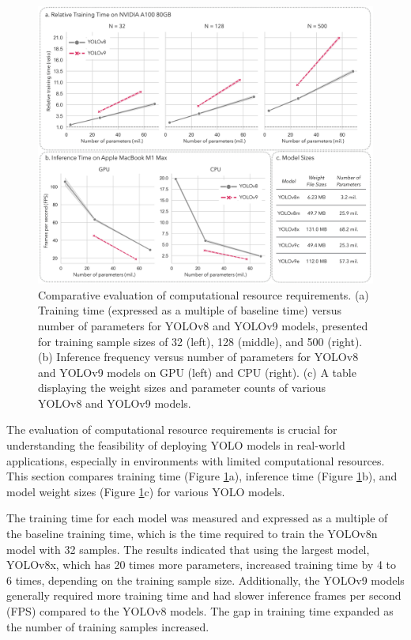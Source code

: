 \begin{figure}[h]
    \centering
    \includegraphics[width=1\textwidth]{figure_6.jpg}
    \caption{Comparative evaluation of computational resource requirements. (a) Training time (expressed as a multiple of baseline time) versus number of parameters for YOLOv8 and YOLOv9 models, presented for training sample sizes of 32 (left), 128 (middle), and 500 (right). (b) Inference frequency versus number of parameters for YOLOv8 and YOLOv9 models on GPU (left) and CPU (right). (c) A table displaying the weight sizes and parameter counts of various YOLOv8 and YOLOv9 models.}
    \label{fig:resources}
\end{figure}

The evaluation of computational resource requirements is crucial for understanding the feasibility of deploying YOLO models in real-world applications, especially in environments with limited computational resources. This section compares training time (Figure \ref{fig:resources}a), inference time (Figure \ref{fig:resources}b), and model weight sizes (Figure \ref{fig:resources}c) for various YOLO models.

The training time for each model was measured and expressed as a multiple of the baseline training time, which is the time required to train the YOLOv8n model with 32 samples. The results indicated that using the largest model, YOLOv8x, which has 20 times more parameters, increased training time by 4 to 6 times, depending on the training sample size. Additionally, the YOLOv9 models generally required more training time and had slower inference frames per second (FPS) compared to the YOLOv8 models. The gap in training time expanded as the number of training samples increased.

